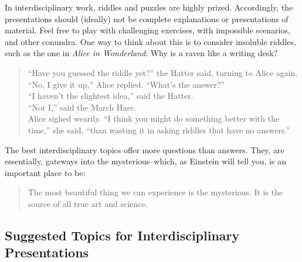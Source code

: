 \documentclass[letterpaper,oneside,11pt,draft]{memoir}
\begin{document}
In interdisciplinary work, riddles and puzzles are highly prized.
Accordingly, the presentations should (ideally) not be complete
explanations or presentations of material. Feel free to play with
challenging exercises, with impossible scenarios, and other conundra.
One way to think about this is to consider insoluble riddles, such as
the one in \textit{Alice in Wonderland}: Why is a raven like a
writing desk?

\begin{quote}
  ``Have you guessed the riddle yet?'' the Hatter said, turning to Alice again.\\
``No, I give it up,'' Alice replied. ``What's the answer?''\\
``I haven't the slightest idea,'' said the Hatter.\\
``Nor I,'' said the March Hare.\\
Alice sighed wearily. ``I think you might do something better with the time,'' she said, ``than wasting it in asking riddles that have no answers.''
\end{quote}

The best interdisciplinary topics offer more questions than answers.
They, are essentially, gateways into the mysterious--which, as
Einstein will tell you, is an important place to be:

\begin{quote}
  The most beautiful thing we can experience is the mysterious. It is
  the source of all true art and science.
\end{quote}

\subsection{Suggested Topics for Interdisciplinary Presentations}
\end{document}
